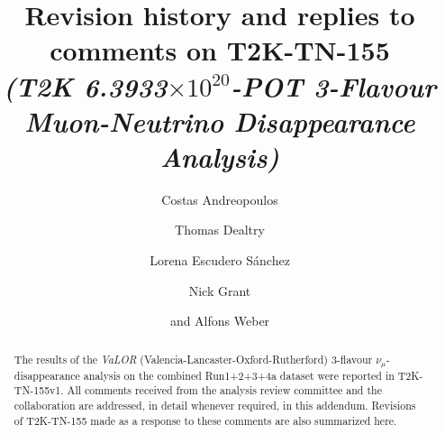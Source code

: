%
%

\begin{frontmatter}

\title{
  Revision history and replies to comments on T2K-TN-155\\
  {\em(T2K 6.3933$\times10^{20}$-POT 3-Flavour Muon-Neutrino Disappearance Analysis)}
}

\vspace*{0.7cm}

\author[RAL]     {Costas Andreopoulos}
\author[RAL,OXF] {Thomas Dealtry}
\author[IFIC]    {Lorena Escudero S\'anchez}
\author[LANCS]   {Nick Grant}
\author[RAL,OXF] {and Alfons Weber}

\address[RAL]{Particle Physics Dept., Rutherford Appleton Laboratory, STFC \\
              Harwell Oxford Campus\\
              Oxfordshire OX11 0QX, UK}

\address[OXF]{Subdepartment of Particle Physics, University of Oxford \\
              Denys Wilkinson Building, Keble Road\\
              Oxfordshire OX1 3RH, UK}

\address[IFIC]{Instituto de Fisica Corpuscular\\
              CSIC and University of Valencia\\
              Valencia, Spain}

\address[LANCS]{Physics Dept., Lancaster University \\
              Lancaster, LA1 4YB, UK}

%
%

\begin{abstract}

The results of the {\em VaLOR} (Valencia-Lancaster-Oxford-Rutherford) 
3-flavour $\nu_{\mu}$-disappearance analysis on the combined Run1+2+3+4a dataset 
were reported in T2K-TN-155v1.
All comments received from the analysis review committee and the collaboration
are addressed, in detail whenever required, in this addendum.
Revisions of T2K-TN-155 made as a response to these comments 
are also summarized here.

\end{abstract}

\end{frontmatter}


\tableofcontents

\clearpage



